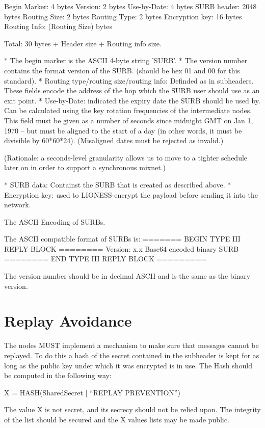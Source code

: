    Begin Marker: 4 bytes
   Version:      2 bytes
   Use-by-Date:  4 bytes
   SURB header:  2048 bytes
   Routing Size: 2 bytes
   Routing Type: 2 bytes
   Encryption key: 16 bytes
   Routing Info: (Routing Size) bytes

   Total: 30 bytes + Header size + Routing info size.

* The begin marker is the ASCII 4-byte string 'SURB'. 
* The version number contains the format version of the SURB.
  (should be hex 01 and 00 for this standard).
* Routing type/routing size/routing info: Definded as in subheaders.  
  These fields encode the address of the hop which the SURB user should
  use as an exit point.
* Use-by-Date: indicated the expiry date the SURB should be used by. Can
  be calculated using the key rotation frequencies of the intermediate
  nodes.  This field must be given as a number of seconds since
  midnight GMT on Jan 1, 1970 -- but must be aligned to the start of a
  day (in other words, it must be divisible by 60*60*24).
  (Misaligned dates must be rejected as invalid.)

  (Rationale: a seconds-level granularity allows us to move to a
  tighter schedule later on in order to support a synchronous mixnet.)

* SURB data: Containst the SURB that is created as described
  above. 
* Encryption key: used to LIONESS-encrypt the payload before sending it
  into the network.  

The ASCII Encoding of SURBs.

The  ASCII compatible format of SURBs is:
======= BEGIN TYPE III REPLY BLOCK ========
Version: x.x
Base64 encoded binary SURB 
======== END TYPE III REPLY BLOCK =========

The version number should be in decimal ASCII and is the same as the
binary version.

\section{Replay Avoidance}

The nodes MUST implement a mechanism to make sure that messages cannot
be replayed. To do this a hash of the secret contained in the
subheader is kept for as long as the public key under which it was
encrypted is in use. The Hash should be computed in the following way:

X = HASH(SharedSecret | ``REPLAY PREVENTION'')

The value X is not secret, and its secrecy should not be relied upon.
The integrity of the list should be secured and the X values lists may
be made public.

